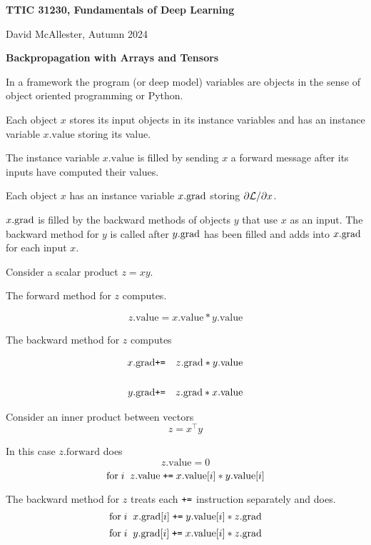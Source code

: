 




{\Huge
  
  \centerline{\bf TTIC 31230, Fundamentals of Deep Learning}
  \bigskip
  \centerline{David McAllester, Autumn 2024}
  \vfill
  \vfill
  \centerline{\bf Backpropagation with Arrays and Tensors}
  \vfill
  \vfill



\vfill
In a framework the program (or deep model) variables are objects in the sense of object oriented programming or Python.

\vfill
Each object $x$ stores its input objects in its instance variables and has an instance variable $x.\mathrm{value}$ storing its value.

\vfill
The instance variable $x.\mathrm{value}$ is filled by sending $x$ a forward message after its inputs have computed their values.

\vfill
{\color{red} Each object $x$ has an instance variable $x.\mathrm{grad}$ storing $\partial {\cal L}/\partial x$.}

\vfill
$x.\mathrm{grad}$ is filled by the backward methods of objects $y$ that
use $x$ as an input.  The backward method for $y$ is called after $y.\mathrm{grad}$ has been filled and adds into $x.\mathrm{grad}$ for each input $x$.


Consider a scalar product $z = xy$.

\vfill
The forward method for $z$ computes.

$$z.\mathrm{value} = x.\mathrm{value}*y.\mathrm{value}$$

\vfill
The backward method for $z$ computes

\begin{eqnarray*}
x.\mathrm{grad} & \mbox{\tt +=} & z.\mathrm{grad} * y.\mathrm{value} \\
\\
y.\mathrm{grad} & \mbox{\tt +=} & z.\mathrm{grad} * x.\mathrm{value}
\end{eqnarray*}


Consider an inner product between vectors
$$z = x^\top y$$

\vfill
In this case $z.\mathrm{forward}$ does
$$z.\mathrm{value} = 0$$
$$\mathrm{for}\;i\;\;z.\mathrm{value} \;\mbox{\tt +=}\;x.\mathrm{value}[i]*y.\mathrm{value}[i]$$

\vfill
The backward method for $z$  treats each $\mbox{\tt +=}$ instruction separately and does.
$$\mathrm{for}\;i\;\;x.\mathrm{grad}[i] \;\mbox{\tt +=}\;y.\mathrm{value}[i]*z.\mathrm{grad}$$
$$\mathrm{for}\;i\;\;y.\mathrm{grad}[i] \;\mbox{\tt +=}\;x.\mathrm{value}[i]*z.\mathrm{grad}$$

}

